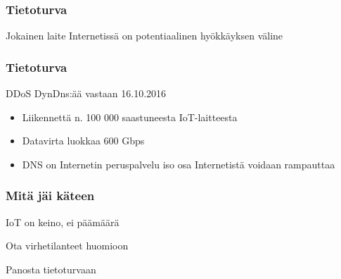 \documentclass{beamer}
\begin{document}
\begin{frame}
\frametitle{Tietoturva}
\Huge{Jokainen laite Internetissä on potentiaalinen hyökkäyksen väline}
\end{frame}

\begin{frame}
\frametitle{Tietoturva}
DDoS DynDns:ää vastaan 16.10.2016
\begin{itemize}
\item Liikennettä n. 100 000 saastuneesta IoT-laitteesta
\item Datavirta luokkaa 600 Gbps
\item DNS on Internetin peruspalvelu \textrightarrow iso osa Internetistä voidaan rampauttaa
\end{itemize}
\end{frame}


\begin{frame}
\frametitle{Mitä jäi käteen}
\Huge{IoT on keino, ei päämäärä}

\hfill

\Huge{Ota virhetilanteet huomioon}

\hfill

\Huge{Panosta tietoturvaan}
\end{frame}

\end{document}
